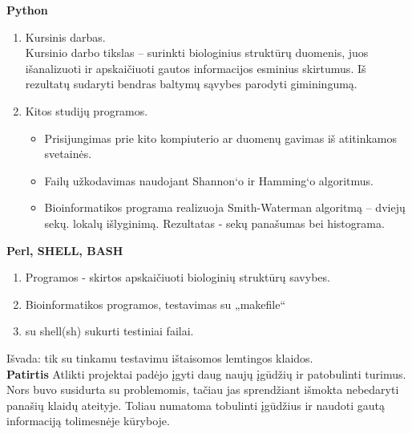 \documentclass[a4paper,12pt]{article}
\begin{document}
\textbf{Python}
\begin{enumerate}
	\item Kursinis darbas.\\
	Kursinio darbo tikslas – surinkti biologinius struktūrų duomenis, juos išanalizuoti ir apskaičiuoti gautos informacijos esminius skirtumus. Iš rezultatų sudaryti bendras baltymų
	sąvybes parodyti giminingumą.
	\item Kitos studijų programos.
		\begin{itemize}
			\item Prisijungimas prie kito kompiuterio ar duomenų gavimas iš atitinkamos svetainės.
			\item Failų užkodavimas naudojant Shannon‘o ir Hamming‘o algoritmus. 
			\item Bioinformatikos programa realizuoja Smith-Waterman algoritmą – dviejų sekų.
lokalų išlyginimą. Rezultatas - sekų panašumas bei histograma.
		\end{itemize}

\end{enumerate}

\textbf{Perl, SHELL, BASH }

\begin{enumerate}
	\item Programos - skirtos apskaičiuoti biologinių struktūrų savybes.
	\item Bioinformatikos programos, testavimas su „makefile“
	\item su shell(sh) sukurti testiniai failai.
\end{enumerate}
Išvada: tik su tinkamu testavimu ištaisomos lemtingos klaidos.\\



\textbf{Patirtis}
Atlikti projektai padėjo įgyti daug naujų įgūdžių ir patobulinti turimus. Nors buvo susidurta su problemomis, tačiau jas sprendžiant išmokta nebedaryti panašių klaidų ateityje. Toliau numatoma tobulinti įgūdžius ir naudoti gautą informaciją tolimesnėje kūryboje.
\end{document}
